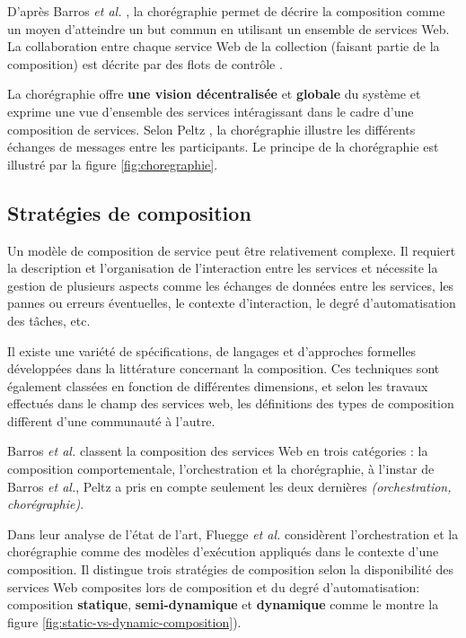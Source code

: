    D'après Barros \emph{et al.} \cite{barros2006standards}, la
    chorégraphie permet de décrire la composition comme un moyen
    d'atteindre un but commun en utilisant un ensemble de services
    Web. La collaboration entre chaque service Web de la collection
    (faisant partie de la composition) est décrite par des flots de
    contrôle \cite{lopez2008selection}.\medskip

    La chorégraphie offre \textbf{une vision décentralisée} et
    \textbf{globale} du système et exprime une vue d'ensemble des
    services intéragissant dans le cadre d'une composition de
    services. Selon Peltz \cite{peltz2003web}, la chorégraphie
    illustre les différents échanges de messages entre les
    participants. Le principe de la chorégraphie est illustré par la
    figure \ref{fig:choregraphie}.

  \subsection{Stratégies de composition}
  \label{sec:types-de-composition}
  Un modèle de composition de service peut être relativement
  complexe. Il requiert la description et l'organisation de
  l'interaction entre les services et nécessite la gestion de
  plusieurs aspects comme les échanges de données entre les services,
  les pannes ou erreurs éventuelles, le contexte d'interaction, le
  degré d'automatisation des tâches, etc. \medskip

  Il existe une variété de spécifications, de langages et
  d'approches formelles développées dans la littérature concernant la
  composition. Ces techniques sont également classées en fonction de
  différentes dimensions, et selon les travaux effectués dans le champ
  des services web, les définitions des types de composition diffèrent
  d'une communauté à l'autre.\medskip

  Barros \emph{et al.} \cite{barros2006standards} classent la
  composition des services Web en trois catégories : la composition
  comportementale, l'orchestration et la chorégraphie, à l'instar de
  Barros \emph{et al.}, Peltz \cite{peltz2003web} a pris en compte
  seulement les deux dernières \textit{(orchestration,
    chorégraphie)}.\medskip

  

  Dans leur analyse de l'état de l'art, Fluegge \emph{et
    al.}\cite{fluegge2006challenges} considèrent l'orchestration et la
  chorégraphie comme des modèles d'exécution appliqués dans le
  contexte d'une composition. Il distingue trois stratégies de
  composition selon la disponibilité des services Web composites lors
  de composition et du degré d'automatisation: composition
  \textbf{statique}, \textbf{semi-dynamique} et \textbf{dynamique}
  comme le montre la figure \ref{fig:static-vs-dynamic-composition}).

